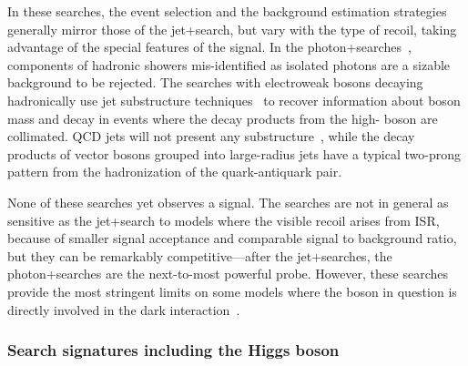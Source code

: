 In these searches, the event selection and the background estimation strategies generally mirror those of the jet+\MET search, but vary with the type of recoil, taking advantage of the special features of the signal.
In the photon+\MET searches~\cite{Aaboud:2017dor,CMS-PAS-EXO-16-014}, components of hadronic showers mis-identified as isolated photons are a sizable background to be rejected.
The searches with electroweak bosons decaying hadronically use jet substructure techniques~\cite{Sirunyan:2017jix,Aaboud:2016qgg} to recover information about boson mass and decay in events where the decay products from the high-\pt{} boson are collimated.
QCD jets will not present any substructure~\cite{Larkoski:2017jix}, while the decay products of vector bosons grouped into large-radius jets have a typical two-prong pattern from the hadronization of the quark-antiquark pair.

None of these searches yet observes a signal. The searches are not in general as sensitive as the jet+\MET search to models where the visible recoil arises from ISR, because of smaller signal acceptance and comparable signal to background ratio, but they can be remarkably competitive---after the jet+\MET searches, the photon+\MET searches are the next-to-most powerful probe.
However, these searches provide the most stringent limits on some models where the boson in question is directly involved in the dark interaction~\cite{Petrov:2013nia,Berlin:2014cfa}.%

\subsubsection{Search signatures including the Higgs boson}


